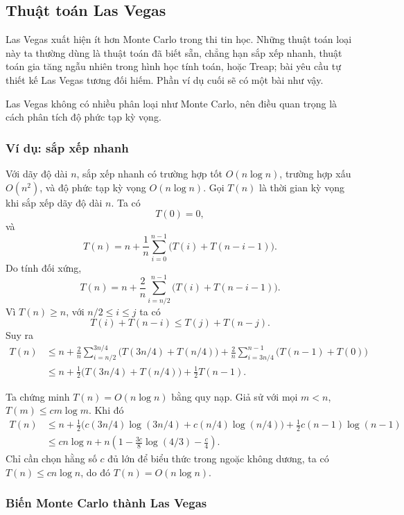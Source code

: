 \documentclass[11pt]{article}
\begin{document}
\subsection{Thuật toán Las Vegas}

Las Vegas xuất hiện ít hơn Monte Carlo trong thi tin học. Những thuật toán loại
này ta thường dùng là thuật toán đã biết sẵn, chẳng hạn sắp xếp nhanh, thuật
toán gia tăng ngẫu nhiên trong hình học tính toán, hoặc Treap; bài yêu cầu tự
thiết kế Las Vegas tương đối hiếm. Phần ví dụ cuối sẽ có một bài như vậy.

Las Vegas không có nhiều phân loại như Monte Carlo, nên điều quan trọng là cách
phân tích độ phức tạp kỳ vọng.

\subsubsection{Ví dụ: sắp xếp nhanh}

Với dãy độ dài \(n\), sắp xếp nhanh có trường hợp tốt \(O(n\log n)\), trường hợp
xấu \(O(n^2)\), và độ phức tạp kỳ vọng \(O(n\log n)\). Gọi \(T(n)\) là thời gian
kỳ vọng khi sắp xếp dãy độ dài \(n\). Ta có
\[
  T(0)=0,
\]
và
\[
  T(n)=n+\frac1n\sum_{i=0}^{n-1}\bigl(T(i)+T(n-i-1)\bigr).
\]
Do tính đối xứng,
\[
  T(n)
  = n+\frac2n\sum_{i=n/2}^{n-1}\bigl(T(i)+T(n-i-1)\bigr).
\]
Vì \(T(n)\ge n\), với \(n/2\le i\le j\) ta có
\[
  T(i)+T(n-i)\le T(j)+T(n-j).
\]
Suy ra
\[
\begin{aligned}
  T(n)
  &\le n+\frac2n\sum_{i=n/2}^{3n/4}\bigl(T(3n/4)+T(n/4)\bigr)
       +\frac2n\sum_{i=3n/4}^{n-1}\bigl(T(n-1)+T(0)\bigr)\\
  &\le n+\frac12\bigl(T(3n/4)+T(n/4)\bigr)+\frac12T(n-1).
\end{aligned}
\]

Ta chứng minh \(T(n)=O(n\log n)\) bằng quy nạp. Giả sử với mọi \(m<n\),
\(T(m)\le cm\log m\). Khi đó
\[
\begin{aligned}
T(n)
&\le n+\frac12\bigl(c(3n/4)\log(3n/4)+c(n/4)\log(n/4)\bigr)
       +\frac12c(n-1)\log(n-1)\\
&\le cn\log n+n\left(1-\frac{3c}{8}\log(4/3)-\frac c4\right).
\end{aligned}
\]
Chỉ cần chọn hằng số \(c\) đủ lớn để biểu thức trong ngoặc không dương, ta có
\(T(n)\le cn\log n\), do đó \(T(n)=O(n\log n)\).

\subsubsection{Biến Monte Carlo thành Las Vegas}
\end{document}
